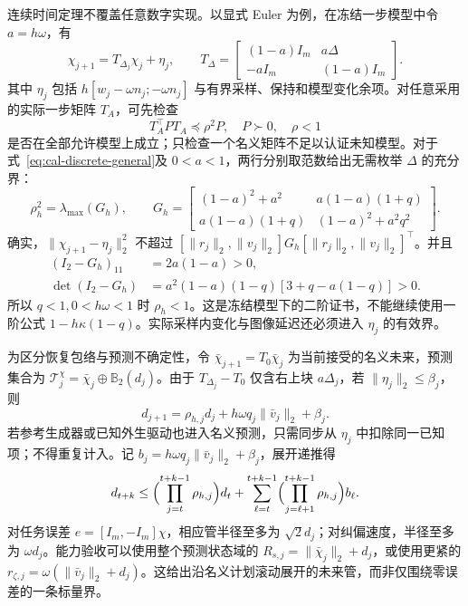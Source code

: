 \documentclass[11pt,a4paper]{article}
\numberwithin{equation}{section}
\theoremstyle{definition}
\begin{document}
连续时间定理不覆盖任意数字实现。以显式 Euler 为例，在冻结一步模型中令 $a=h\omega$，有
\begin{equation}
 \chi_{j+1}=T_{\Delta_j}\chi_j+\eta_j,\qquad
 T_\Delta=
 \begin{bmatrix}(1-a)I_m&a\Delta\\-aI_m&(1-a)I_m\end{bmatrix}.
 \label{eq:cal-discrete-general}
\end{equation}
其中 $\eta_j$ 包括 $h[w_j-\omega n_j;-\omega n_j]$ 与有界采样、保持和模型变化余项。对任意采用的实际一步矩阵 $T_A$，可先检查
\begin{equation}
 T_A^\top P T_A\preceq\rho^2P,
 \quad P\succ0,\quad\rho<1
 \label{eq:cal-discrete-matrix-certificate}
\end{equation}
是否在全部允许模型上成立；只检查一个名义矩阵不足以认证未知模型。对于式~\eqref{eq:cal-discrete-general}及 $0<a<1$，两行分别取范数给出无需枚举 $\Delta$ 的充分界：
\begin{equation}
 \rho_h^2=\lambda_{\max}(G_h),\qquad
 G_h=\begin{bmatrix}
 (1-a)^2+a^2&a(1-a)(1+q)\\
 a(1-a)(1+q)&(1-a)^2+a^2q^2
 \end{bmatrix}.
 \label{eq:cal-discrete-rho}
\end{equation}
确实，$\|\chi_{j+1}-\eta_j\|_2^2$ 不超过
$[\|r_j\|_2,\|v_j\|_2]G_h[\|r_j\|_2,\|v_j\|_2]^\top$。并且
\begin{align}
 (I_2-G_h)_{11}&=2a(1-a)>0,\\
 \det(I_2-G_h)&=a^2(1-a)(1-q)
                   [3+q-a(1-q)]>0.
\end{align}
所以 $q<1,0<h\omega<1$ 时 $\rho_h<1$。这是冻结模型下的二阶证书，不能继续使用一阶公式 $1-h\kappa(1-q)$。实际采样内变化与图像延迟还必须进入 $\eta_j$ 的有效界。

为区分恢复包络与预测不确定性，令 $\bar\chi_{j+1}=T_0\bar\chi_j$ 为当前接受的名义未来，预测集合为
$\mathcal T_j^\chi=\bar\chi_j\oplus\mathbb B_2(d_j)$。由于
$T_{\Delta_j}-T_0$ 仅含右上块 $a\Delta_j$，若 $\|\eta_j\|_2\le\beta_j$，则
\begin{equation}
 \boxed{d_{j+1}=\rho_{h,j}d_j
             +h\omega q_j\|\bar v_j\|_2+\beta_j.}
 \label{eq:cal-tube-recursion}
\end{equation}
若参考生成器或已知外生驱动也进入名义预测，只需同步从 $\eta_j$ 中扣除同一已知项；不得重复计入。记 $b_j=h\omega q_j\|\bar v_j\|_2+\beta_j$，展开递推得
\begin{equation}
 d_{t+k}\le
 \Bigl(\prod_{j=t}^{t+k-1}\rho_{h,j}\Bigr)d_t+
 \sum_{\ell=t}^{t+k-1}
 \Bigl(\prod_{j=\ell+1}^{t+k-1}\rho_{h,j}\Bigr)b_\ell.
 \label{eq:cal-future-tube}
\end{equation}
对任务误差 $e=[I_m,-I_m]\chi$，相应管半径至多为 $\sqrt2d_j$；对纠偏速度，半径至多为 $\omega d_j$。能力验收可以使用整个预测状态域的 $R_{s,j}=\|\bar\chi_j\|_2+d_j$，或使用更紧的 $r_{\zeta,j}=\omega(\|\bar v_j\|_2+d_j)$。这给出沿名义计划滚动展开的未来管，而非仅围绕零误差的一条标量界。
\end{document}
